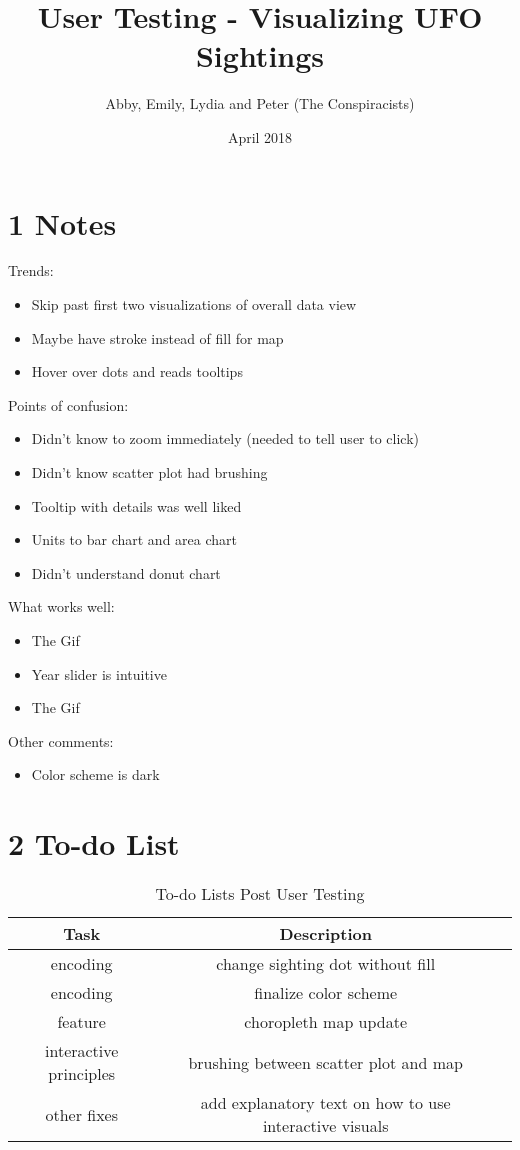 \documentclass{neu_handout}
\title{User Testing - Visualizing UFO Sightings}
\author{Abby, Emily, Lydia and Peter (The Conspiracists)}
\date{April 2018}
\begin{document}
\section*{1 Notes}

Trends:\
\begin{itemize}
  \item Skip past first two visualizations of overall data view
  \item Maybe have stroke instead of fill for map
  \item Hover over dots and reads tooltips
\end{itemize}

Points of confusion:\
\begin{itemize}
  \item Didn't know to zoom immediately (needed to tell user to click)
   \item Didn't know scatter plot had brushing
  \item Tooltip with details was well liked
  \item Units to bar chart and area chart
  \item Didn't understand donut chart
\end{itemize}

What works well:\
\begin{itemize}
  \item The Gif
  \item Year slider is intuitive
  \item The Gif
\end{itemize}

Other comments:\
\begin{itemize}
  \item Color scheme is dark
\end{itemize}

\section*{2 To-do List}

\begin{table}[h]
\caption{To-do Lists Post User Testing} %
\centering %
\begin{tabular}{c c c} %
\hline\hline %
 Task & Description \\ [0.5ex]
\hline %

encoding &
change sighting dot without fill \\[1ex] %

encoding &
finalize color scheme \\[1ex] %

feature & 
choropleth map update \\[1ex] %

interactive principles &
brushing between scatter plot and map \\

other fixes &
add explanatory text on how to use interactive visuals \\

\hline 
\end{tabular}
\label{tab:PPer}
\end{table}
\end{document}
